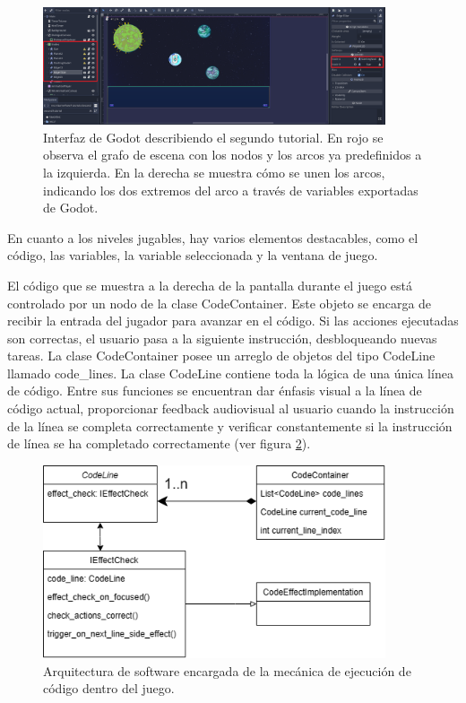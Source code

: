 \begin{figure}[h]
	\centering
	\includegraphics[width=0.9\textwidth]{imagenes/SecondTutorialGraph.png}
	\caption{Interfaz de Godot describiendo el segundo tutorial. En rojo se observa el grafo de escena con los nodos y los arcos ya predefinidos a la izquierda. En la derecha se muestra cómo se unen los arcos, indicando los dos extremos del arco a través de variables exportadas de Godot.}
	\label{SecondTutorialGraph}
\end{figure}


En cuanto a los niveles jugables, hay varios elementos destacables, como el código, las variables, la variable seleccionada y la ventana de juego.

El código que se muestra a la derecha de la pantalla durante el juego está controlado por un nodo de la clase CodeContainer. Este objeto se encarga de recibir la entrada del jugador para avanzar en el código. Si las acciones ejecutadas son correctas, el usuario pasa a la siguiente instrucción, desbloqueando nuevas tareas. La clase CodeContainer posee un arreglo de objetos del tipo CodeLine llamado code\_lines. La clase CodeLine contiene toda la lógica de una única línea de código. Entre sus funciones se encuentran dar énfasis visual a la línea de código actual, proporcionar feedback audiovisual al usuario cuando la instrucción de la línea se completa correctamente y verificar constantemente si la instrucción de línea se ha completado correctamente (ver figura \ref{CodeLinesArchitecture}).

\begin{figure}[h]
	\centering
	\includegraphics[width=0.9\textwidth]{imagenes/code_lines_architecture.png}
	\caption{Arquitectura de software encargada de la mecánica de ejecución de código dentro del juego.}
	\label{CodeLinesArchitecture}
\end{figure}

